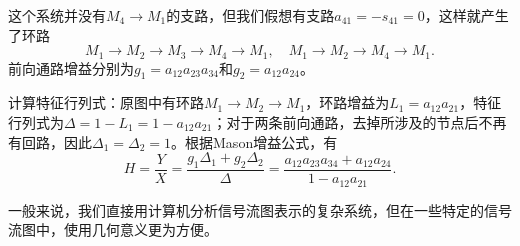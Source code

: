 \begin{example}
    这个系统并没有$M_4\to M_1$的支路，但我们假想有支路$a_{41}=-s_{41}=0$，这样就产生了环路
    \begin{equation}
        M_1\to M_2\to M_3\to M_4\to M_1,\quad M_1\to M_2\to M_4\to M_1.
    \end{equation}
    前向通路增益分别为$g_1=a_{12}a_{23}a_{34}$和$g_2=a_{12}a_{24}$。

    计算特征行列式：原图中有环路$M_1\to M_2\to M_1$，环路增益为$L_1=a_{12}a_{21}$，特征行列式为$\Delta=1-L_1=1-a_{12}a_{21}$；对于两条前向通路，去掉所涉及的节点后不再有回路，因此$\Delta_1=\Delta_2=1$。根据Mason增益公式，有
    \begin{equation}
        H=\frac{Y}{X}=\frac{g_1\Delta_1+g_2\Delta_2}{\Delta}=\frac{a_{12}a_{23}a_{34}+a_{12}a_{24}}{1-a_{12}a_{21}}.
    \end{equation}
\end{example}

一般来说，我们直接用计算机分析信号流图表示的复杂系统，但在一些特定的信号流图中，使用几何意义更为方便。

